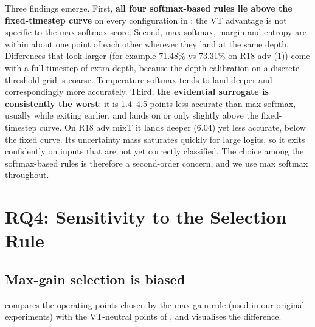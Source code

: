 Three findings emerge. First, \textbf{all four softmax-based rules lie above the fixed-timestep curve} on every configuration in : the VT advantage is not specific to the max-softmax score. Second, max softmax, margin and entropy are within about one point of each other wherever they land at the same depth. Differences that look larger (for example 71.48\% vs 73.31\% on R18 adv (1)) come with a full timestep of extra depth, because the depth calibration on a discrete threshold grid is coarse. Temperature softmax tends to land deeper and correspondingly more accurately. Third, \textbf{the evidential surrogate is consistently the worst}: it is 1.4--4.5 points less accurate than max softmax, usually while exiting earlier, and lands on or only slightly above the fixed-timestep curve. On R18 adv mixT it lands deeper (6.04) yet less accurate, below the fixed curve. Its uncertainty mass saturates quickly for large logits, so it exits confidently on inputs that are not yet correctly classified. The choice among the softmax-based rules is therefore a second-order concern, and we use max softmax throughout.

\section{RQ4: Sensitivity to the Selection Rule}
\label{sec:res-selection}

\subsection{Max-gain selection is biased}

 compares the operating points chosen by the max-gain rule (used in our original experiments) with the VT-neutral points of , and  visualises the difference.

